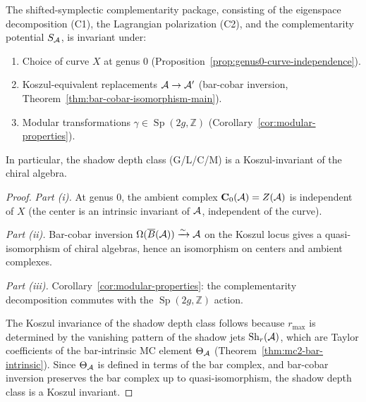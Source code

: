 \begin{theorem}
\label{thm:thqg-III-universality}
The shifted-symplectic complementarity package, consisting
of the eigenspace decomposition \textup{(C1)}, the Lagrangian
polarization \textup{(C2)}, and the complementarity potential
$S_{\mathcal{A}}$, is invariant under:
\begin{enumerate}[label=\textup{(\roman*)}]
\item Choice of curve $X$ at genus $0$
 \textup{(}Proposition~\textup{\ref{prop:genus0-curve-independence})}.
\item Koszul-equivalent replacements $\mathcal{A} \to \mathcal{A}'$
 \textup{(}bar-cobar inversion,
 Theorem~\textup{\ref{thm:bar-cobar-isomorphism-main})}.
\item Modular transformations $\gamma \in
 \operatorname{Sp}(2g, \mathbb{Z})$
 \textup{(}Corollary~\textup{\ref{cor:modular-properties})}.
\end{enumerate}
In particular, the shadow depth class \textup{(G/L/C/M)} is a
Koszul-invariant of the chiral algebra.
\end{theorem}

\begin{proof}
\emph{Part (i).}
At genus $0$, the ambient complex
$\mathbf{C}_0(\mathcal{A}) = Z(\mathcal{A})$ is independent of $X$
(the center is an intrinsic invariant of $\mathcal{A}$,
independent of the curve).

\emph{Part (ii).}
Bar-cobar inversion
$\Omega(\overline{B}(\mathcal{A})) \xrightarrow{\sim} \mathcal{A}$ on the Koszul
locus gives a quasi-isomorphism of chiral algebras, hence
an isomorphism on centers and ambient complexes.

\emph{Part (iii).}
Corollary~\ref{cor:modular-properties}: the complementarity
decomposition commutes with the $\operatorname{Sp}(2g, \mathbb{Z})$
action.

The Koszul invariance of the shadow depth class follows because
$r_{\max}$ is determined by the vanishing pattern of the shadow
jets $\mathrm{Sh}_r(\mathcal{A})$, which are Taylor coefficients of the
bar-intrinsic MC element $\Theta_{\mathcal{A}}$
(Theorem~\ref{thm:mc2-bar-intrinsic}). Since $\Theta_{\mathcal{A}}$ is
defined in terms of the bar complex, and bar-cobar inversion
preserves the bar complex up to quasi-isomorphism, the shadow
depth class is a Koszul invariant.
\end{proof}

